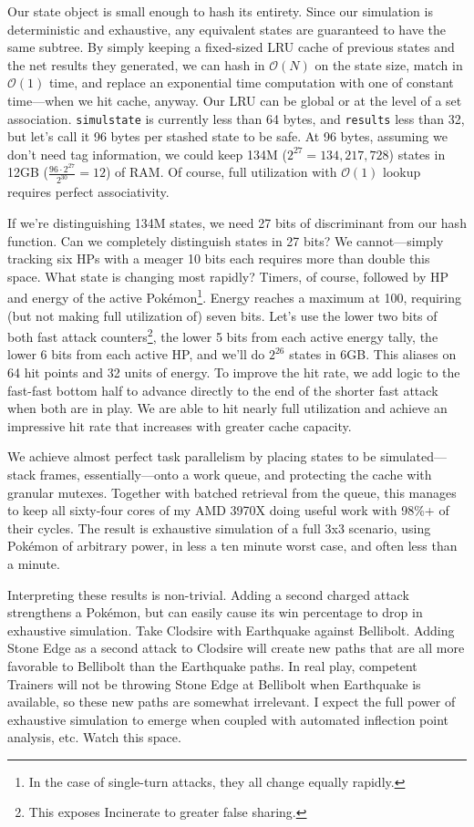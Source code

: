Our state object is small enough to hash its entirety.
Since our simulation is deterministic and exhaustive, any equivalent states
 are guaranteed to have the same subtree.
By simply keeping a fixed-sized LRU cache of previous states and the net results they
 generated, we can hash in $\mathcal{O}(N)$ on the state size, match in $\mathcal{O}(1)$
 time, and replace an exponential time computation with one of constant time---when we hit cache, anyway.
Our LRU can be global or at the level of a set association.
\texttt{simulstate} is currently less than 64 bytes, and \texttt{results} less than 32, but
 let's call it 96 bytes per stashed state to be safe.
At 96 bytes, assuming we don't need tag information, we could keep 134M ($2^{27} = 134,217,728$) states
 in 12GB ($\frac{96\cdot2^{27}}{2^{30}} = 12$) of RAM\@.
Of course, full utilization with $\mathcal{O}(1)$ lookup requires perfect associativity.

If we're distinguishing 134M states, we need 27 bits of discriminant from our hash function.
Can we completely distinguish states in 27 bits?
We cannot---simply tracking six HPs with a meager 10 bits each requires more than double this space.
What state is changing most rapidly?
Timers, of course, followed by HP and energy of the active Pokémon\footnote{In the case of single-turn attacks, they all change equally rapidly.}.
Energy reaches a maximum at 100, requiring (but not making full utilization of) seven bits.
Let's use the lower two bits of both fast attack counters\footnote{This exposes Incinerate to greater false sharing.},
 the lower 5 bits from each active energy tally, the lower 6 bits from each
 active HP, and we'll do $2^{26}$ states in 6GB\@.
This aliases on 64 hit points and 32 units of energy.
To improve the hit rate, we add logic to the fast-fast bottom half to advance directly
 to the end of the shorter fast attack when both are in play.
We are able to hit nearly full utilization and achieve an impressive hit rate that
 increases with greater cache capacity.

We achieve almost perfect task parallelism by placing states to be simulated---stack frames,
 essentially---onto a work queue, and protecting the cache with granular mutexes.
Together with batched retrieval from the queue, this manages to keep all sixty-four
 cores of my AMD 3970X doing useful work with 98\%+ of their cycles.
The result is exhaustive simulation of a full 3x3 scenario, using Pokémon of arbitrary power,
 in less a ten minute worst case, and often less than a minute.

Interpreting these results is non-trivial.
Adding a second charged attack strengthens a Pokémon, but can easily cause its
 win percentage to drop in exhaustive simulation.
Take Clodsire with Earthquake against Bellibolt.
Adding Stone Edge as a second attack to Clodsire will create new paths that are all
 more favorable to Bellibolt than the Earthquake paths.
In real play, competent Trainers will not be throwing Stone Edge at Bellibolt when Earthquake is available,
 so these new paths are somewhat irrelevant.
I expect the full power of exhaustive simulation to emerge when coupled with automated
 inflection point analysis, etc.
Watch this space.
